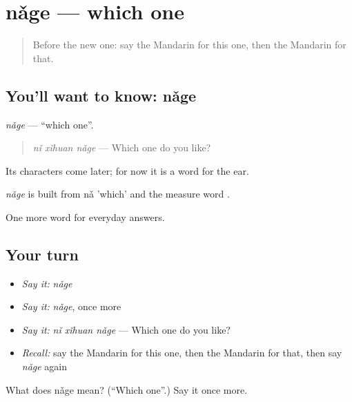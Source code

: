 \section[nǎge]{nǎge — which one}

\label{lesson:ZH-C37-nage-which}



\begin{quote}
Before the new one: say the Mandarin for this one, then the Mandarin for that.
\end{quote}

\subsection*{You'll want to know: nǎge}
\emph{nǎge} — \textquotedblleft{}which one\textquotedblright{}.

\begin{quote}
\emph{nǐ xǐhuan nǎge} — Which one do you like?
\end{quote}

Its characters come later; for now it is a word for the ear.

\begin{cousinweb}
\emph{nǎge} is built from nǎ 'which' and the measure word .
\end{cousinweb}

\begin{grammarlens}[title={What you've built}]
One more word for everyday answers.
\end{grammarlens}

\subsection*{Your turn}
\begin{itemize}
\raggedright
  \item \emph{Say it:} \emph{nǎge}
  \item \emph{Say it:} \emph{nǎge}, once more
  \item \emph{Say it:} \emph{nǐ xǐhuan nǎge} — Which one do you like?
  \item \emph{Recall:} say the Mandarin for this one, then the Mandarin for that, then say \emph{nǎge} again
\end{itemize}

\begin{tcolorbox}[breakable,colback=teal!4,colframe=teal!35!black,title={Before you move on}]
What does nǎge mean? (\textquotedblleft{}Which one\textquotedblright{}.) Say it once more.
\end{tcolorbox}
